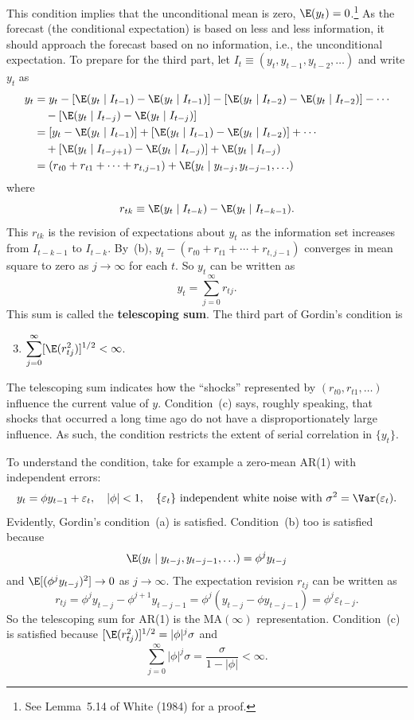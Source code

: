 This condition implies that the unconditional mean is zero, $\E(y_t) = 0$.\footnote{See Lemma~5.14 of White (1984) for a proof.}
As the forecast (the conditional expectation) is based on less and less information, it should
approach the forecast based on no information, i.e., the unconditional expectation.
To prepare for the third part, let $I_t \equiv (y_t, y_{t-1}, y_{t-2}, \ldots)$ and write $y_t$ as
\begin{align*}
  y_t &= y_t - [\E(y_t \mid I_{t-1}) - \E(y_t \mid I_{t-1})] - [\E(y_t \mid I_{t-2}) - \E(y_t \mid I_{t-2})] - \cdots \\
  &\quad - [\E(y_t \mid I_{t-j}) - \E(y_t \mid I_{t-j})] \\
  &= [y_t - \E(y_t \mid I_{t-1})] + [\E(y_t \mid I_{t-1}) - \E(y_t \mid I_{t-2})] + \cdots \\
  &\quad + [\E(y_t \mid I_{t-j+1}) - \E(y_t \mid I_{t-j})] + \E(y_t \mid I_{t-j}) \\
  &= (r_{t0} + r_{t1} + \cdots + r_{t,j-1}) + \E(y_t \mid y_{t-j}, y_{t-j-1}, \ldots)
\end{align*}
where
\[
  r_{tk} \equiv \E(y_t \mid I_{t-k}) - \E(y_t \mid I_{t-k-1}).
\]
This $r_{tk}$ is the revision of expectations about $y_t$ as the information set increases
from $I_{t-k-1}$ to $I_{t-k}$. By~(b), $y_t - (r_{t0} + r_{t1} + \cdots + r_{t,j-1})$ converges in mean square
to zero as $j \to \infty$ for each $t$. So $y_t$ can be written as
\[
  y_t = \sum_{j=0}^{\infty} r_{tj}.
\]
This sum is called the \textbf{telescoping sum}. The third part of Gordin's condition is
\begin{enumerate}[label=(\alph*)]
\setcounter{enumi}{2}
\item $\displaystyle \sum_{j=0}^{\infty} [\E(r_{tj}^2)]^{1/2} < \infty$.
\end{enumerate}
The telescoping sum indicates how the ``shocks'' represented by $(r_{t0}, r_{t1}, \ldots)$ influence
the current value of $y$. Condition~(c) says, roughly speaking, that shocks that
occurred a long time ago do not have a disproportionately large influence. As such,
the condition restricts the extent of serial correlation in $\{y_t\}$.

To understand the condition, take for example a zero-mean AR(1) with independent
errors:
\[
  y_t = \phi y_{t-1} + \varepsilon_t, \quad |\phi| < 1, \quad
  \{\varepsilon_t\} \text{ independent white noise with } \sigma^2 = \Var(\varepsilon_t).
\]
Evidently, Gordin's condition~(a) is satisfied. Condition~(b) too is satisfied because
\begin{equation}
  \E(y_t \mid y_{t-j}, y_{t-j-1}, \ldots) = \phi^j y_{t-j}
  \label{eq:6.5.4}
\end{equation}
and $\E[(\phi^j y_{t-j})^2] \to 0$ as $j \to \infty$. The expectation revision $r_{tj}$ can be written as
\begin{equation}
  r_{tj} = \phi^j y_{t-j} - \phi^{j+1} y_{t-j-1}
  = \phi^j (y_{t-j} - \phi y_{t-j-1}) = \phi^j \varepsilon_{t-j}.
  \label{eq:6.5.5}
\end{equation}
So the telescoping sum for AR(1) is the $\text{MA}(\infty)$ representation. Condition~(c) is
satisfied because $[\E(r_{tj}^2)]^{1/2} = |\phi|^j \sigma$ and
\[
  \sum_{j=0}^{\infty} |\phi|^j \sigma = \frac{\sigma}{1 - |\phi|} < \infty.
\]

